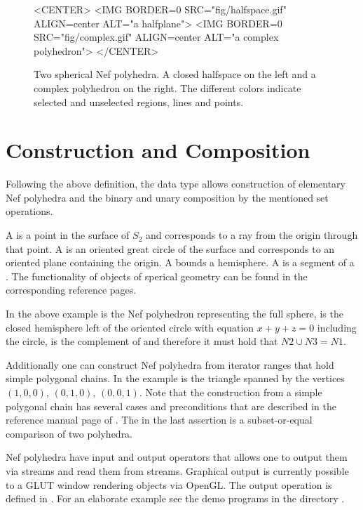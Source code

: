 \begin{figure}[htbp]
\begin{ccTexOnly}
\begin{center}
\end{center}
\end{ccTexOnly}
\caption{Two spherical Nef polyhedra. A closed halfspace on the left 
  and a complex polyhedron on the right. The different colors indicate
  selected and unselected regions, lines and points.}\label{nefsexamples}
\begin{ccHtmlOnly}
<CENTER>
<IMG BORDER=0 SRC="fig/halfspace.gif" ALIGN=center
ALT="a halfplane">
<IMG BORDER=0 SRC="fig/complex.gif" ALIGN=center
ALT="a complex polyhedron">
</CENTER>
\end{ccHtmlOnly}
\end{figure}      

\section{Construction and Composition}

Following the above definition, the data type
 allows construction of elementary Nef
polyhedra and the binary and unary composition by the mentioned set
operations.

A  is a point in the surface of $S_2$ and
corresponds to a ray from the origin through that point. A
 is an oriented great circle of the surface and
corresponds to an oriented plane containing the origin. A
 bounds a hemisphere. A  is 
a segment of a . The functionality of objects
of sperical geometry can be found in the corresponding reference
pages.


In the above example  is the Nef polyhedron representing
the full sphere,  is the closed hemisphere left of the
oriented circle with equation $x + y + z = 0$ including the circle,
 is the complement of  and therefore it must hold that
$N2 \cup N3 = N1$.

Additionally one can construct Nef polyhedra from iterator ranges that
hold simple polygonal chains. In the example  is the triangle
spanned by the vertices $(1,0,0)$, $(0,1,0)$, $(0,0,1)$.  Note that
the construction from a simple polygonal chain has several cases and
preconditions that are described in the reference manual page of
. The  in the last assertion
is a subset-or-equal comparison of two polyhedra.

Nef polyhedra have input and output operators that allows one to
output them via streams and read them from streams. Graphical output
is currently possible to a GLUT window rendering objects via OpenGL.
The output operation is defined in
. For an elaborate
example see the demo programs in the directory .

